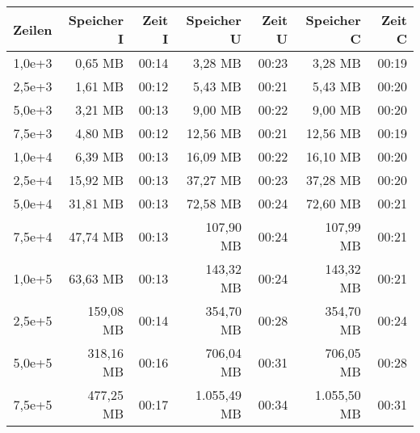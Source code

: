 \begin{table}
    \centering
    \begin{tabular}{|r|r|r|r|r|r|r|}
        \hline
        \textbf{Zeilen} & \textbf{Speicher I} & \textbf{Zeit I} & \textbf{Speicher U} & \textbf{Zeit U} & \textbf{Speicher C} & \textbf{Zeit C} \\ \hline
        1,0e+3          & 0,65 MB             & 00:14           & 3,28 MB             & 00:23           & 3,28 MB             & 00:19           \\ \hline
        2,5e+3          & 1,61 MB             & 00:12           & 5,43 MB             & 00:21           & 5,43 MB             & 00:20           \\ \hline
        5,0e+3          & 3,21 MB             & 00:13           & 9,00 MB             & 00:22           & 9,00 MB             & 00:20           \\ \hline
        7,5e+3          & 4,80 MB             & 00:12           & 12,56 MB            & 00:21           & 12,56 MB            & 00:19           \\ \hline
        1,0e+4          & 6,39 MB             & 00:13           & 16,09 MB            & 00:22           & 16,10 MB            & 00:20           \\ \hline
        2,5e+4          & 15,92 MB            & 00:13           & 37,27 MB            & 00:23           & 37,28 MB            & 00:20           \\ \hline
        5,0e+4          & 31,81 MB            & 00:13           & 72,58 MB            & 00:24           & 72,60 MB            & 00:21           \\ \hline
        7,5e+4          & 47,74 MB            & 00:13           & 107,90 MB           & 00:24           & 107,99 MB           & 00:21           \\ \hline
        1,0e+5          & 63,63 MB            & 00:13           & 143,32 MB           & 00:24           & 143,32 MB           & 00:21           \\ \hline
        2,5e+5          & 159,08 MB           & 00:14           & 354,70 MB           & 00:28           & 354,70 MB           & 00:24           \\ \hline
        5,0e+5          & 318,16 MB           & 00:16           & 706,04 MB           & 00:31           & 706,05 MB           & 00:28           \\ \hline
        7,5e+5          & 477,25 MB           & 00:17           & 1.055,49 MB         & 00:34           & 1.055,50 MB         & 00:31           \\ \hline

\end{tabular}
\end{table}
